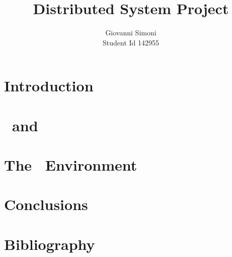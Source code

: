 \documentclass[a4paper]{article}
\title{Distributed System Project}
\author{Giovanni Simoni\\ Student Id 142955}
\begin{document}
    \maketitle
    \newpage

    \tableofcontents
    \newpage

    \section{Introduction}
    

    \section{\Erlang\ and \OTP} \label{sec:erlang-and-otp}
    

    \section{The \YUNA\ Environment} \label{sec:the-yuna-environment}
    

    \section{Conclusions}
    

    \section{Bibliography}
    
\end{document}
